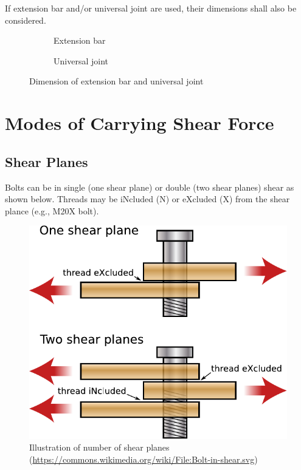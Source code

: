 If extension bar and/or universal joint are used, their dimensions shall also be considered.
\begin{figure}[H]
\centering
\begin{subfigure}{.49\linewidth}\centering

\caption{Extension bar}
\end{subfigure}\hfill
\begin{subfigure}{.49\linewidth}\centering

\caption{Universal joint}
\end{subfigure}
\caption{Dimension of extension bar and universal joint \citep{ASI2016}}
\end{figure}
\section{Modes of Carrying Shear Force}
\subsection{Shear Planes}
Bolts can be in single (one shear plane) or double (two shear planes) shear as shown below. Threads may be iNcluded (N) or eXcluded (X) from the shear plance (e.g., M20X bolt).
\begin{figure}[H]
\centering
\includegraphics{PIC/CH06/SP}
\caption{Illustration of number of shear planes (\href{https://commons.wikimedia.org/wiki/File:Bolt-in-shear.svg}{\url{https://commons.wikimedia.org/wiki/File:Bolt-in-shear.svg}})}
\end{figure}
